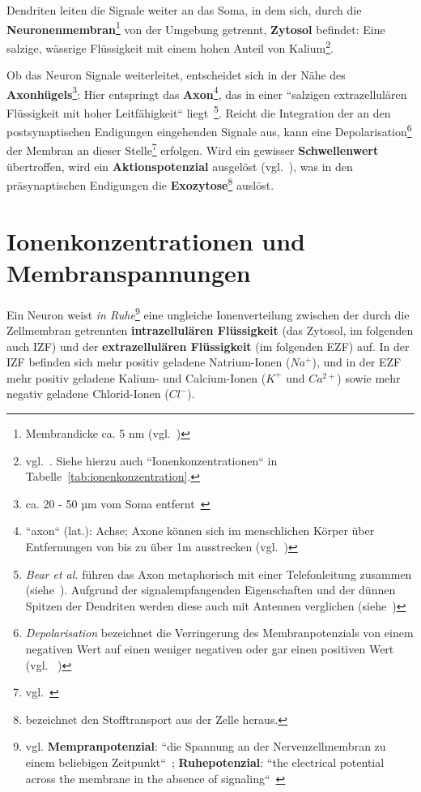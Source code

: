 Dendriten leiten die Signale weiter an das Soma, in dem sich, durch die \textbf{Neuronenmembran}\footnote{
 Membrandicke ca. 5 nm (vgl.~\cite[66]{FE19})
} von der Umgebung getrennt, \textbf{Zytosol} befindet: Eine salzige, wässrige Flüssigkeit mit einem hohen Anteil von Kalium\footnote{vgl.~\cite[29]{BCP18}. Siehe hierzu auch ``Ionenkonzentrationen`` in Tabelle~\ref{tab:ionenkonzentration}.
}.

Ob das Neuron Signale weiterleitet, entscheidet sich in der Nähe des \textbf{Axonhügels}\footnote{
 ca. 20 - 50 µm vom Soma entfernt~\cite[77]{Jon19}
}: Hier entspringt das \textbf{Axon}\footnote{
 ``axon`` (lat.): Achse; Axone können sich im menschlichen Körper über Entfernungen von bis zu über 1m ausstrecken (vgl.~\cite[28]{BCP18})
}, das in einer ``salzigen extrazellulären Flüssigkeit mit hoher Leitfähigkeit`` liegt~\cite[61]{BCP18}\footnote{
 \textit{Bear et al.} führen das Axon metaphorisch mit einer Telefonleitung zusammen (siehe~\cite[43]{BCP18}). Aufgrund der signalempfangenden Eigenschaften und der dünnen Spitzen der Dendriten werden diese auch mit Antennen verglichen (siehe~\cite[28]{BCP18})
}.
Reicht die Integration der an den postsynaptischen Endigungen eingehenden Signale aus, kann eine Depolarisation\footnote{
  \textit{Depolarisation} bezeichnet die Verringerung des Membranpotenzials von einem negativen Wert auf einen weniger negativen oder gar einen positiven Wert (vgl. ~\cite[95 f.]{SBB+13})
} der Membran an dieser Stelle\footnote{vgl.~\cite[61]{Eil19}} erfolgen. Wird ein gewisser \textbf{Schwellenwert} übertroffen, wird ein \textbf{Aktionspotenzial} ausgelöst (vgl.~\cite[142 f.]{BCP18}), was in den präsynaptischen Endigungen die \textbf{Exozytose}\footnote{
  bezeichnet den Stofftransport aus der Zelle heraus.
} auslöst.


\section{Ionenkonzentrationen und Membranspannungen}\label{sec-ionenkonzentrationen}

Ein Neuron weist \textit{in Ruhe}\footnote{
 vgl. \textbf{Mempranpotenzial}: ``die Spannung an der Nervenzellmembran zu einem beliebigen Zeitpunkt``~\cite[70]{BCP18}; \textbf{Ruhepotenzial}: ``the electrical potential across the membrane in the absence of signaling``~\cite[126]{KSJ+13}
} eine ungleiche Ionenverteilung zwischen der durch die Zellmembran getrennten \textbf{intrazellulären Flüssigkeit} (das Zytosol, im folgenden auch IZF) und der \textbf{extrazellulären Flüssigkeit} (im folgenden EZF) auf.
In der IZF befinden sich mehr positiv geladene Natrium-Ionen ($Na^+$), und in der EZF mehr positiv geladene Kalium- und Calcium-Ionen ($K^+$ und $Ca^{2+}$) sowie mehr negativ geladene Chlorid-Ionen ($Cl^-$).

